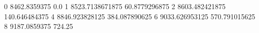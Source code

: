 0 8462.8359375 0.0
1 8523.7138671875 60.8779296875
2 8603.482421875 140.646484375
4 8846.923828125 384.087890625
6 9033.626953125 570.791015625
8 9187.0859375 724.25
